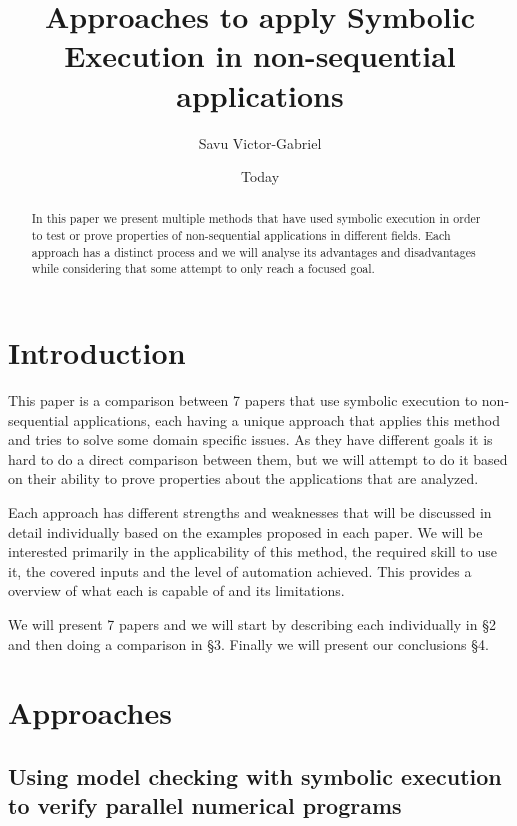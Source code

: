 \documentclass[10pt]{llncs}
\begin{document}
\title{Approaches to apply Symbolic Execution in non-sequential applications}
\author{Savu Victor-Gabriel}
\date{Today}
\maketitle

\begin{abstract}
	In this paper we present multiple methods that have used symbolic execution in order to test or prove properties of non-sequential applications in different fields. Each approach has a distinct process and we will analyse its advantages and disadvantages while considering that some attempt to only reach a focused goal.
\end{abstract}

\section{Introduction}

This paper is a comparison between 7 papers that use symbolic execution to non-sequential applications, each having a unique approach that applies this method and tries to solve some domain specific issues. As they  have different goals it is hard to do a direct comparison between them, but we will attempt to do it based on their ability to prove properties about the applications that are analyzed.

Each approach has different strengths and weaknesses that will be discussed in detail individually based on the examples proposed in each paper. We will be interested primarily in the applicability of this method, the required skill to use it, the covered inputs and the level of automation achieved. This provides a overview of what each is capable of and its limitations.

We will present 7 papers \cite{base1, base2, base3, base4, base5, base6, base7} and we will start by describing each individually in §2 and then doing a comparison in §3. Finally we will present our conclusions §4.

\section{Approaches}

\subsection{Using model checking with symbolic execution to verify parallel numerical programs \cite{base1}}
\end{document}
